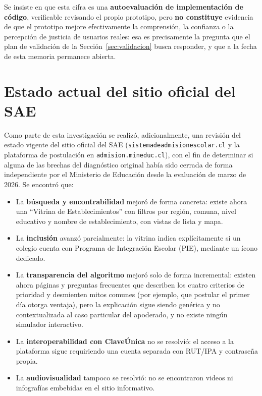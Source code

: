 Se insiste en que esta cifra es una \textbf{autoevaluación de implementación de código}, verificable revisando el propio prototipo, pero \textbf{no constituye} evidencia de que el prototipo mejore efectivamente la comprensión, la confianza o la percepción de justicia de usuarios reales: esa es precisamente la pregunta que el plan de validación de la Sección~\ref{sec:validacion} busca responder, y que a la fecha de esta memoria permanece abierta.

\section{Estado actual del sitio oficial del SAE}

Como parte de esta investigación se realizó, adicionalmente, una revisión del estado vigente del sitio oficial del SAE (\texttt{sistemadeadmisionescolar.cl} y la plataforma de postulación en \texttt{admision.mineduc.cl}), con el fin de determinar si alguna de las brechas del diagnóstico original había sido cerrada de forma independiente por el Ministerio de Educación desde la evaluación de marzo de 2026. Se encontró que:

\begin{itemize}
    \item La \textbf{búsqueda y encontrabilidad} mejoró de forma concreta: existe ahora una ``Vitrina de Establecimientos'' con filtros por región, comuna, nivel educativo y nombre de establecimiento, con vistas de lista y mapa.
    \item La \textbf{inclusión} avanzó parcialmente: la vitrina indica explícitamente si un colegio cuenta con Programa de Integración Escolar (PIE), mediante un ícono dedicado.
    \item La \textbf{transparencia del algoritmo} mejoró solo de forma incremental: existen ahora páginas y preguntas frecuentes que describen los cuatro criterios de prioridad y desmienten mitos comunes (por ejemplo, que postular el primer día otorga ventaja), pero la explicación sigue siendo genérica y no contextualizada al caso particular del apoderado, y no existe ningún simulador interactivo.
    \item La \textbf{interoperabilidad con ClaveÚnica} no se resolvió: el acceso a la plataforma sigue requiriendo una cuenta separada con RUT/IPA y contraseña propia.
    \item La \textbf{audiovisualidad} tampoco se resolvió: no se encontraron videos ni infografías embebidas en el sitio informativo.
\end{itemize}

